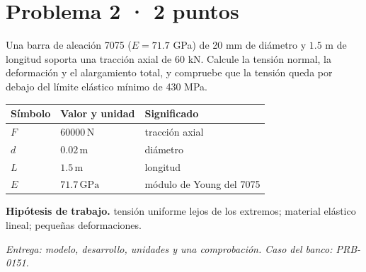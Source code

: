 \par\medskip\noindent\begin{minipage}{\linewidth}

\section{Problema 2 · 2 puntos}

Una barra de aleación 7075 ($E = 71.7$ GPa) de 20 mm de diámetro y $1.5$ m de longitud soporta una tracción axial de 60 kN. Calcule la tensión normal, la deformación y el alargamiento total, y compruebe que la tensión queda por debajo del límite elástico mínimo de 430 MPa.

\par\medskip\noindent\begin{tabular}{@{}p{.18\linewidth}p{.26\linewidth}p{.48\linewidth}@{}}
\toprule Símbolo & Valor y unidad & Significado\\\midrule
$F$ & $60000\,\mathrm{N}$ & tracción axial\\
$d$ & $0.02\,\mathrm{m}$ & diámetro\\
$L$ & $1.5\,\mathrm{m}$ & longitud\\
$E$ & $71.7\,\mathrm{GPa}$ & módulo de Young del 7075\\
\bottomrule\end{tabular}\par\medskip



\par\textbf{Hipótesis de trabajo.} tensión uniforme lejos de los extremos; material elástico lineal; pequeñas deformaciones.

\par\textit{Entrega: modelo, desarrollo, unidades y una comprobación. Caso del banco: PRB-0151.}\end{minipage}\par\medskip

